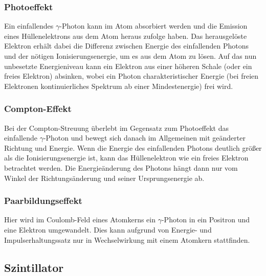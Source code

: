 \documentclass[
	a4paper,
	12pt,
	pagesize,
	ngerman
]{scrartcl}
\begin{document}
	\subsubsection{Photoeffekt}
	Ein einfallendes $\gamma$-Photon kann im Atom absorbiert werden und die Emission eines Hüllenelektrons aus dem Atom heraus zufolge haben.
	Das herausgelöste Elektron erhält dabei die Differenz zwischen Energie des einfallenden Photons und der nötigen Ionisierungsenergie, um es aus dem Atom zu lösen.
	Auf das nun unbesetzte Energieniveau kann ein Elektron aus einer höheren Schale (oder ein freies Elektron) absinken, wobei ein Photon charakteristischer Energie (bei freien Elektronen kontinuierliches Spektrum ab einer Mindestenergie) frei wird. %

	\subsubsection{Compton-Effekt}
	Bei der Compton-Streuung überlebt im Gegensatz zum Photoeffekt das einfallende $\gamma$-Photon und bewegt sich danach im Allgemeinen mit geänderter Richtung und Energie. %
	Wenn die Energie des einfallenden Photons deutlich größer als die Ionisierungsenergie ist, kann das Hüllenelektron wie ein freies Elektron betrachtet werden.
	Die Energieänderung des Photons hängt dann nur vom Winkel der Richtungsänderung und seiner Ursprungsenergie ab.

	\subsubsection{Paarbildungseffekt}

	Hier wird im Coulomb-Feld eines Atomkerns ein $\gamma$-Photon in ein Positron und eine Elektron umgewandelt.
	Dies kann aufgrund von Energie- und Impulserhaltungssatz nur in Wechselwirkung mit einem Atomkern stattfinden.

	\subsection{Szintillator}
\end{document}
